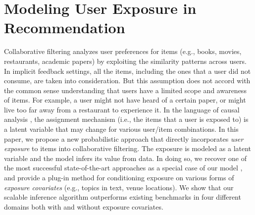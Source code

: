 

\chapter{Modeling User Exposure in Recommendation}



\newcommand{\mypar}[1]{\vspace{0.1in}\noindent \textbf{#1 \,}}

\newcommand{\bY}{ \boldsymbol{Y}}
\newcommand{\bA}{ \boldsymbol{A}}
\newcommand{\bzero}{\boldsymbol{0}}
\newcommand{\bx}{ \boldsymbol{x}}


Collaborative filtering analyzes user preferences for items (e.g., books,
movies, restaurants, academic papers) by exploiting the similarity patterns
across users. In implicit feedback settings, all the items, including the ones 
that a user did not consume, are taken into consideration. But this
assumption does not accord with the common sense understanding that users have
a limited scope and awareness of items. For example, a user might not have
heard of a certain paper, or might live too far away from a restaurant to
experience it. In the language of causal analysis \cite{imbens2015causal}, the
assignment mechanism (i.e., the items that a user is exposed to) is a latent
variable that may change for various user/item combinations. 
In this paper, we propose a new probabilistic approach that directly
incorporates \emph{user exposure} to items into collaborative filtering.
The exposure is modeled as a latent variable and the model infers its
value from data. In doing so, we recover one of the most successful
state-of-the-art approaches as a special case of our model
\cite{hu2008collaborative}, and provide a plug-in method for conditioning
exposure on various forms of \emph{exposure covariates} (e.g., topics in text,
venue locations). We show that our scalable inference algorithm
outperforms existing benchmarks in four different domains both with and
without exposure covariates.





